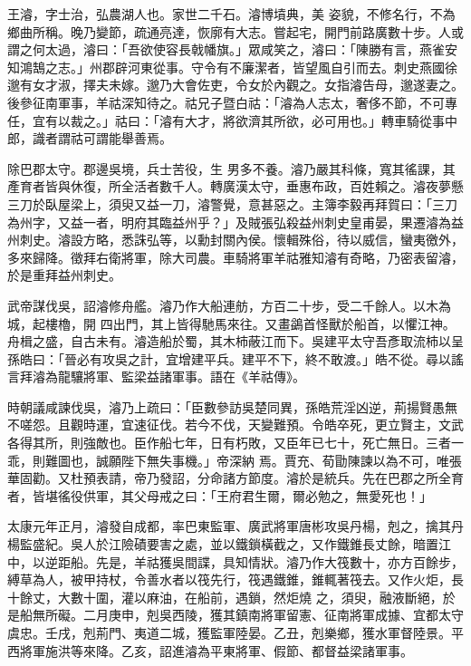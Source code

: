 \begin{pinyinscope}
 王濬，字士治，弘農湖人也。家世二千石。濬博墳典，美
 姿貌，不修名行，不為鄉曲所稱。晚乃變節，疏通亮達，恢廓有大志。嘗起宅，開門前路廣數十步。人或謂之何太過，濬曰：「吾欲使容長戟幡旗。」眾咸笑之，濬曰：「陳勝有言，燕雀安知鴻鵠之志。」州郡辟河東從事。守令有不廉潔者，皆望風自引而去。刺史燕國徐邈有女才淑，擇夫未嫁。邈乃大會佐吏，令女於內觀之。女指濬告母，邈遂妻之。後參征南軍事，羊祜深知待之。祜兄子暨白祜：「濬為人志太，奢侈不節，不可專任，宜有以裁之。」祜曰：「濬有大才，將欲濟其所欲，必可用也。」轉車騎從事中郎，識者謂祜可謂能舉善焉。



 除巴郡太守。郡邊吳境，兵士苦役，生
 男多不養。濬乃嚴其科條，寬其徭課，其產育者皆與休復，所全活者數千人。轉廣漢太守，垂惠布政，百姓賴之。濬夜夢懸三刀於臥屋梁上，須臾又益一刀，濬警覺，意甚惡之。主簿李毅再拜賀曰：「三刀為州字，又益一者，明府其臨益州乎？」及賊張弘殺益州刺史皇甫晏，果遷濬為益州刺史。濬設方略，悉誅弘等，以勳封關內侯。懷輯殊俗，待以威信，蠻夷徼外，多來歸降。徵拜右衛將軍，除大司農。車騎將軍羊祜雅知濬有奇略，乃密表留濬，於是重拜益州刺史。



 武帝謀伐吳，詔濬修舟艦。濬乃作大船連舫，方百二十步，受二千餘人。以木為城，起樓櫓，開
 四出門，其上皆得馳馬來往。又畫鷁首怪獸於船首，以懼江神。舟楫之盛，自古未有。濬造船於蜀，其木柿蔽江而下。吳建平太守吾彥取流柿以呈孫皓曰：「晉必有攻吳之計，宜增建平兵。建平不下，終不敢渡。」皓不從。尋以謠言拜濬為龍驤將軍、監梁益諸軍事。語在《羊祜傳》。



 時朝議咸諫伐吳，濬乃上疏曰：「臣數參訪吳楚同異，孫皓荒淫凶逆，荊揚賢愚無不嗟怨。且觀時運，宜速征伐。若今不伐，天變難預。令皓卒死，更立賢主，文武各得其所，則強敵也。臣作船七年，日有朽敗，又臣年已七十，死亡無日。三者一乖，則難圖也，誠願陛下無失事機。」帝深納
 焉。賈充、荀勖陳諫以為不可，唯張華固勸。又杜預表請，帝乃發詔，分命諸方節度。濬於是統兵。先在巴郡之所全育者，皆堪徭役供軍，其父母戒之曰：「王府君生爾，爾必勉之，無愛死也！」



 太康元年正月，濬發自成都，率巴東監軍、廣武將軍唐彬攻吳丹楊，剋之，擒其丹楊監盛紀。吳人於江險磧要害之處，並以鐵鎖橫截之，又作鐵錐長丈餘，暗置江中，以逆距船。先是，羊祜獲吳間諜，具知情狀。濬乃作大筏數十，亦方百餘步，縛草為人，被甲持杖，令善水者以筏先行，筏遇鐵錐，錐輒著筏去。又作火炬，長十餘丈，大數十圍，灌以麻油，在船前，遇鎖，然炬燒
 之，須臾，融液斷絕，於是船無所礙。二月庚申，剋吳西陵，獲其鎮南將軍留憲、征南將軍成據、宜都太守虞忠。壬戌，剋荊門、夷道二城，獲監軍陸晏。乙丑，剋樂鄉，獲水軍督陸景。平西將軍施洪等來降。乙亥，詔進濬為平東將軍、假節、都督益梁諸軍事。




\end{pinyinscope}
